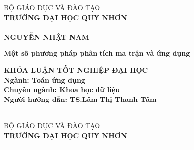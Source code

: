 \documentclass[12pt,a4paper,oneside]{report}
\numberwithin{equation}{section}
\begin{document}
\thispagestyle{empty}
\thisfancypage{\setlength{\fboxsep}{2pt}\setlength{\fboxrule}{2pt}\doublebox}{} 
\begin{center} %
{\fontsize{14pt}{16}\selectfont BỘ GIÁO DỤC VÀ ĐÀO TẠO}\\
\vskip 0.05cm
{\bf\fontsize{14pt}{16}\selectfont TRƯỜNG ĐẠI HỌC QUY NHƠN}\\
{——————————————}\\
\vskip 2cm
{\bf\fontsize{16pt}{22}\selectfont NGUYỄN NHẬT NAM}

\vskip 3cm
\begin{center}
{\bf\fontsize{22pt}{22}\selectfont Một số phương pháp phân tích ma trận và ứng dụng}

\end{center}

\vskip 2.5cm
{\bf\fontsize{16pt}{22}\selectfont KHÓA LUẬN TỐT NGHIỆP ĐẠI HỌC}\\
\vskip 0.5cm
{\bf\fontsize{16pt}{22}\selectfont Ngành: Toán ứng dụng }\\
\vskip 0.05cm
{\bf\fontsize{16pt}{22}\selectfont Chuyên ngành: Khoa học dữ liệu}\\
\vskip 2.5cm
{\bf\fontsize{16pt}{22}\selectfont Người hướng dẫn: TS.Lâm Thị Thanh Tâm}\\

\vfill
{\bf\fontsize{14pt}{16}\selectfont {Bình Định, 2023}}\\
\end{center}
\newpage
\thispagestyle{empty}


\thisfancypage{\setlength{\fboxsep}{2pt}\setlength{\fboxrule}{2pt}\doublebox}{} 
\begin{center} %
{\fontsize{14pt}{16}\selectfont BỘ GIÁO DỤC VÀ ĐÀO TẠO}\\
\vskip 0.05cm
{\bf\fontsize{14pt}{16}\selectfont TRƯỜNG ĐẠI HỌC QUY NHƠN}\\
{——————————————}\\
\end{center}
\end{document}
